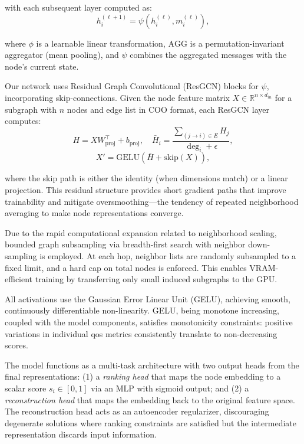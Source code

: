 \documentclass[english]{sbrt}
\begin{document}
\noindent
with each subsequent layer computed as:
\begin{equation}
    h_i^{(\ell+1)} = \psi\left(h_i^{(\ell)},m_i^{(\ell)}\right),
\end{equation}

\noindent
where $\phi$ is a learnable linear transformation, $\mathrm{AGG}$ is a permutation-invariant aggregator (mean pooling), and $\psi$ combines the aggregated messages with the node's current state.

Our network uses Residual Graph Convolutional (ResGCN) blocks for $\psi$, incorporating skip-connections. Given the node feature matrix $X \in \mathbb{R}^{n \times d_{in}}$ for a subgraph with $n$ nodes and edge list in COO format, each ResGCN layer computes:
\begin{equation}
    H = X W_{\mathrm{proj}}^\top + b_{\mathrm{proj}}, \quad
    \bar{H}_i = \frac{\sum_{(j \to i) \in E} H_j}{\deg_i + \epsilon},
\end{equation}
\begin{equation}
    X' = \mathrm{GELU}\!\left(\bar{H} + \mathrm{skip}(X)\right),
\end{equation}

\noindent
where the skip path is either the identity (when dimensions match) or a linear projection. This residual structure provides short gradient paths that improve trainability and mitigate oversmoothing---the tendency of repeated neighborhood averaging to make node representations converge.

Due to the rapid computational expansion related to neighborhood scaling, bounded graph subsampling via breadth-first search with neighbor down-sampling is employed. At each hop, neighbor lists are randomly subsampled to a fixed limit, and a hard cap on total nodes is enforced. This enables VRAM-efficient training by transferring only small induced subgraphs to the GPU.

All activations use the Gaussian Error Linear Unit (GELU), achieving smooth, continuously differentiable non-linearity. GELU, being monotone increasing, coupled with the model components, satisfies monotonicity constraints: positive variations in individual \gls{qos} metrics consistently translate to non-decreasing scores.

The model functions as a multi-task architecture with two output heads from the final representations: (1) a \textit{ranking head} that maps the node embedding to a scalar score $s_i \in [0,1]$ via an MLP with sigmoid output; and (2) a \textit{reconstruction head} that maps the embedding back to the original feature space. The reconstruction head acts as an autoencoder regularizer, discouraging degenerate solutions where ranking constraints are satisfied but the intermediate representation discards input information.
\end{document}
